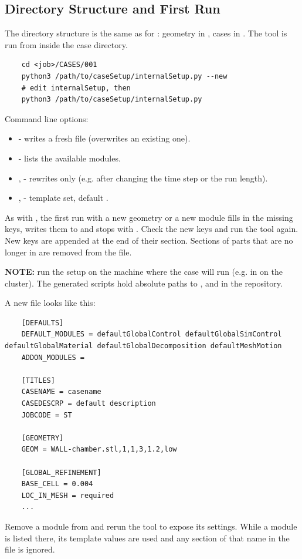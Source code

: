 \subsection{Directory Structure and First Run}
The directory structure is the same as for : geometry in , cases in . The tool is run from inside the case directory.
\begin{lstlisting}
    cd <job>/CASES/001
    python3 /path/to/caseSetup/internalSetup.py --new
    # edit internalSetup, then
    python3 /path/to/caseSetup/internalSetup.py
\end{lstlisting}
Command line options:
\begin{itemize}
    \item {} - writes a fresh  file (overwrites an existing one).
    \item {} - lists the available modules.
    \item {},  - rewrites  only (e.g. after changing the time step or the run length).
    \item {},  - template set, default .
\end{itemize}

As with , the first run with a new geometry or a new module fills in the missing keys, writes them to  and stops with . Check the new keys and run the tool again. New keys are appended at the end of their section. Sections of parts that are no longer in  are removed from the file.

\textbf{NOTE:} run the setup on the machine where the case will run (e.g. in  on the cluster). The generated scripts hold absolute paths to ,  and  in the repository.

A new  file looks like this:
\begin{lstlisting}
    [DEFAULTS]
    DEFAULT_MODULES = defaultGlobalControl defaultGlobalSimControl defaultGlobalMaterial defaultGlobalDecomposition defaultMeshMotion
    ADDON_MODULES =

    [TITLES]
    CASENAME = casename
    CASEDESCRP = default description
    JOBCODE = ST

    [GEOMETRY]
    GEOM = WALL-chamber.stl,1,1,3,1.2,low

    [GLOBAL_REFINEMENT]
    BASE_CELL = 0.004
    LOC_IN_MESH = required
    ...
\end{lstlisting}
Remove a module from  and rerun the tool to expose its settings. While a module is listed there, its template values are used and any section of that name in the file is ignored.

